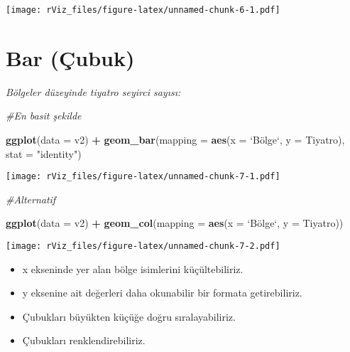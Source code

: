 \documentclass[
]{book}
\newenvironment{Shaded}{\begin{snugshade}}{\end{snugshade}}
\newcommand{\CommentTok}[1]{\textcolor[rgb]{0.56,0.35,0.01}{\textit{#1}}}
\newcommand{\DataTypeTok}[1]{\textcolor[rgb]{0.13,0.29,0.53}{#1}}
\newcommand{\KeywordTok}[1]{\textcolor[rgb]{0.13,0.29,0.53}{\textbf{#1}}}
\newcommand{\NormalTok}[1]{#1}
\newcommand{\OperatorTok}[1]{\textcolor[rgb]{0.81,0.36,0.00}{\textbf{#1}}}
\newcommand{\StringTok}[1]{\textcolor[rgb]{0.31,0.60,0.02}{#1}}
\begin{document}
\texttt{[image: rViz\_files/figure-latex/unnamed-chunk-6-1.pdf]}

\hypertarget{bar-uxe7ubuk}{%
\section{Bar (Çubuk)}\label{bar-uxe7ubuk}}

\emph{Bölgeler düzeyinde tiyatro seyirci sayısı:}

\begin{Shaded}
\begin{Highlighting}[]
\CommentTok{#En basit şekilde}

\KeywordTok{ggplot}\NormalTok{(}\DataTypeTok{data =}\NormalTok{ v2) }\OperatorTok{+}
\StringTok{  }\KeywordTok{geom_bar}\NormalTok{(}\DataTypeTok{mapping =} \KeywordTok{aes}\NormalTok{(}\DataTypeTok{x =} \StringTok{`}\DataTypeTok{Bölge}\StringTok{`}\NormalTok{, }\DataTypeTok{y =}\NormalTok{ Tiyatro), }\DataTypeTok{stat =} \StringTok{"identity"}\NormalTok{)}
\end{Highlighting}
\end{Shaded}

\texttt{[image: rViz\_files/figure-latex/unnamed-chunk-7-1.pdf]}

\begin{Shaded}
\begin{Highlighting}[]
\CommentTok{#Alternatif}

\KeywordTok{ggplot}\NormalTok{(}\DataTypeTok{data =}\NormalTok{ v2) }\OperatorTok{+}
\StringTok{  }\KeywordTok{geom_col}\NormalTok{(}\DataTypeTok{mapping =} \KeywordTok{aes}\NormalTok{(}\DataTypeTok{x =} \StringTok{`}\DataTypeTok{Bölge}\StringTok{`}\NormalTok{, }\DataTypeTok{y =}\NormalTok{ Tiyatro))}
\end{Highlighting}
\end{Shaded}

\texttt{[image: rViz\_files/figure-latex/unnamed-chunk-7-2.pdf]}

\begin{itemize}
\item
  x ekseninde yer alan bölge isimlerini küçültebiliriz.
\item
  y eksenine ait değerleri daha okunabilir bir formata getirebiliriz.
\item
  Çubukları büyükten küçüğe doğru sıralayabiliriz.
\item
  Çubukları renklendirebiliriz.
\end{itemize}
\end{document}

